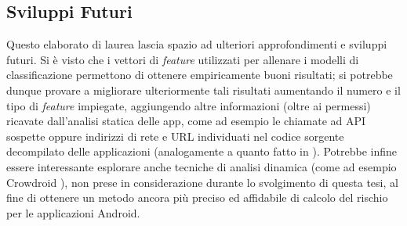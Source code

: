 \documentclass[12pt,a4paper,oneside]{article}
\begin{document}
\subsection*{Sviluppi Futuri}

Questo elaborato di laurea lascia spazio ad ulteriori approfondimenti e sviluppi futuri. Si è visto che i vettori di \textit{feature} utilizzati per allenare i modelli di classificazione permettono di ottenere empiricamente buoni risultati; si potrebbe dunque provare a migliorare ulteriormente tali risultati aumentando il numero e il tipo di \textit{feature} impiegate, aggiungendo altre informazioni (oltre ai permessi) ricavate dall'analisi statica delle app, come ad esempio le chiamate ad \acrshort{API} sospette oppure indirizzi di rete e \acrshort{URL} individuati nel codice sorgente decompilato delle applicazioni (analogamente a quanto fatto in \cite{DREBIN_DATASET}). Potrebbe infine essere interessante esplorare anche tecniche di analisi dinamica (come ad esempio Crowdroid \cite{CROWDROID}), non prese in considerazione durante lo svolgimento di questa tesi, al fine di ottenere un metodo ancora più preciso ed affidabile di calcolo del rischio per le applicazioni Android.





\newpage
\cleardoublepage
{}
{}

\end{document}
